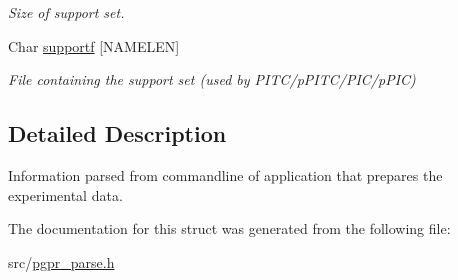 \begin{DoxyCompactItemize}
\begin{DoxyCompactList}\small\item\em Size of support set. \end{DoxyCompactList}\item 
\hypertarget{structt__command__prep_a19ce353138f10d386cbd54bb9f4edb02}{Char \hyperlink{structt__command__prep_a19ce353138f10d386cbd54bb9f4edb02}{supportf} \mbox{[}N\-A\-M\-E\-L\-E\-N\mbox{]}}\label{structt__command__prep_a19ce353138f10d386cbd54bb9f4edb02}

\begin{DoxyCompactList}\small\item\em File containing the support set (used by P\-I\-T\-C/p\-P\-I\-T\-C/\-P\-I\-C/p\-P\-I\-C) \end{DoxyCompactList}\end{DoxyCompactItemize}


\subsection{Detailed Description}
Information parsed from commandline of application that prepares the experimental data. 

The documentation for this struct was generated from the following file\-:\begin{DoxyCompactItemize}
\item 
src/\hyperlink{pgpr__parse_8h}{pgpr\-\_\-parse.\-h}\end{DoxyCompactItemize}
